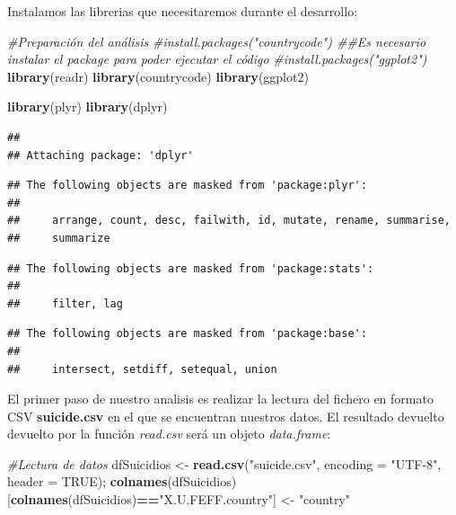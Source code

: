 \documentclass[]{article}
\newenvironment{Shaded}{\begin{snugshade}}{\end{snugshade}}
\newcommand{\CommentTok}[1]{\textcolor[rgb]{0.56,0.35,0.01}{\textit{#1}}}
\newcommand{\DataTypeTok}[1]{\textcolor[rgb]{0.13,0.29,0.53}{#1}}
\newcommand{\KeywordTok}[1]{\textcolor[rgb]{0.13,0.29,0.53}{\textbf{#1}}}
\newcommand{\NormalTok}[1]{#1}
\newcommand{\OperatorTok}[1]{\textcolor[rgb]{0.81,0.36,0.00}{\textbf{#1}}}
\newcommand{\OtherTok}[1]{\textcolor[rgb]{0.56,0.35,0.01}{#1}}
\newcommand{\StringTok}[1]{\textcolor[rgb]{0.31,0.60,0.02}{#1}}
\begin{document}
Instalamos las librerias que necesitaremos durante el desarrollo:

\begin{Shaded}
\begin{Highlighting}[]
\CommentTok{#Preparación del análisis}
\CommentTok{#install.packages("countrycode") ##Es necesario instalar el package para poder ejecutar el código}
\CommentTok{#install.packages("ggplot2")}
\KeywordTok{library}\NormalTok{(readr)}
\KeywordTok{library}\NormalTok{(countrycode)}
\KeywordTok{library}\NormalTok{(ggplot2)}

\KeywordTok{library}\NormalTok{(plyr)}
\KeywordTok{library}\NormalTok{(dplyr)}
\end{Highlighting}
\end{Shaded}

\begin{verbatim}
## 
## Attaching package: 'dplyr'
\end{verbatim}

\begin{verbatim}
## The following objects are masked from 'package:plyr':
## 
##     arrange, count, desc, failwith, id, mutate, rename, summarise,
##     summarize
\end{verbatim}

\begin{verbatim}
## The following objects are masked from 'package:stats':
## 
##     filter, lag
\end{verbatim}

\begin{verbatim}
## The following objects are masked from 'package:base':
## 
##     intersect, setdiff, setequal, union
\end{verbatim}

El primer paso de nuestro analisis es realizar la lectura del fichero en
formato CSV \textbf{suicide.csv} en el que se encuentran nuestros datos.
El resultado devuelto devuelto por la función \emph{read.csv} será un
objeto \emph{data.frame}:

\begin{Shaded}
\begin{Highlighting}[]
\CommentTok{#Lectura de datos}
\NormalTok{dfSuicidios <-}\StringTok{ }\KeywordTok{read.csv}\NormalTok{(}\StringTok{"suicide.csv"}\NormalTok{, }\DataTypeTok{encoding =} \StringTok{"UTF-8"}\NormalTok{, }\DataTypeTok{header =} \OtherTok{TRUE}\NormalTok{);}
\KeywordTok{colnames}\NormalTok{(dfSuicidios)[}\KeywordTok{colnames}\NormalTok{(dfSuicidios)}\OperatorTok{==}\StringTok{"X.U.FEFF.country"}\NormalTok{] <-}\StringTok{ "country"}
\end{Highlighting}
\end{Shaded}
\end{document}
